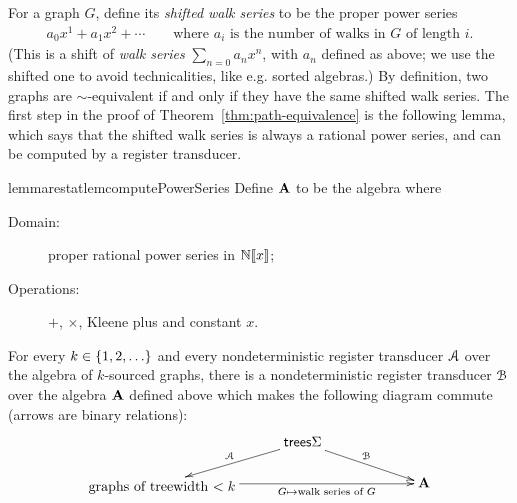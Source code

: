 For a graph $G$, define its \emph{shifted walk series} to be the proper power series 
\begin{align*}
  a_0 x^1 + a_1 x^2 + \cdots \qquad \text{where $a_i$ is the number of walks in $G$ of length $i$.}
\end{align*}
(This is a shift of \emph{walk series} $\sum_{n=0}a_nx^n$, with $a_n$ defined as above; we use the shifted one to avoid technicalities, like e.g. sorted algebras.)
By definition, two graphs are $\sim$-equivalent if and only if they have the same shifted walk series. 
The first step in the proof of Theorem~\ref{thm:path-equivalence} is the following lemma, which says that the shifted walk series is always a rational power series, and can be computed by a register transducer.
\begin{restatable}{lemmarestat}{lemcomputePowerSeries}\label{lem:compute-power-series}    
    Define  $\mathbf{A}$ to be the  algebra where
    \begin{description}
        \item[Domain:] proper rational power series in $\mathbb N [\![x]\!]$;
        \item[Operations:] $+$, $\times$, Kleene plus and constant $x$.
    \end{description}
    For every $k \in \{1,2,\ldots\}$ and every nondeterministic register transducer ${{\mathcal A}}$ over the algebra of $k$-sourced graphs, there is a  nondeterministic register transducer ${\mathcal B}$ over the algebra  $\mathbf{A}$ defined above which makes the following diagram commute (arrows are binary relations):
    \begin{align*}
    \xymatrix@C=1cm@R=0.5cm{
       &  \trees \Sigma   
        \ar[drr]^{\Bb}
        \ar[dl]_{\Aa} \\
        \txt{graphs of
        treewidth $< k$} \ar[rrr]_-{G \mapsto \text{walk series of $G$}}&& & \aalg
    }
    \end{align*}
\end{restatable}

